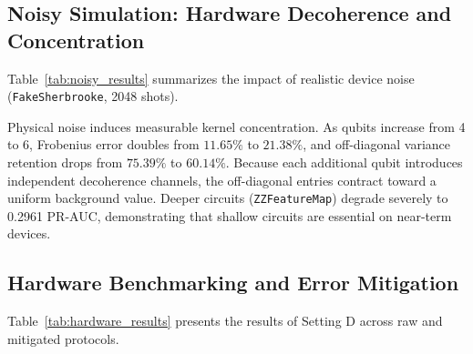 \documentclass[12pt,a4paper]{article}
\begin{document}
\subsection{Noisy Simulation: Hardware Decoherence and Concentration}

Table~\ref{tab:noisy_results} summarizes the impact of realistic device noise (\texttt{FakeSherbrooke}, 2048 shots).

\begin{table}[ht]
\centering
\small
\caption{Setting C Noisy simulation distortion on IBM FakeSherbrooke.}
\label{tab:noisy_results}
\end{table}

Physical noise induces measurable kernel concentration. As qubits increase from 4 to 6, Frobenius error doubles from $11.65\%$ to $21.38\%$, and off-diagonal variance retention drops from $75.39\%$ to $60.14\%$. Because each additional qubit introduces independent decoherence channels, the off-diagonal entries contract toward a uniform background value. Deeper circuits (\texttt{ZZFeatureMap}) degrade severely to 0.2961 PR-AUC, demonstrating that shallow circuits are essential on near-term devices.

\subsection{Hardware Benchmarking and Error Mitigation}

Table~\ref{tab:hardware_results} presents the results of Setting D across raw and mitigated protocols.
\end{document}
